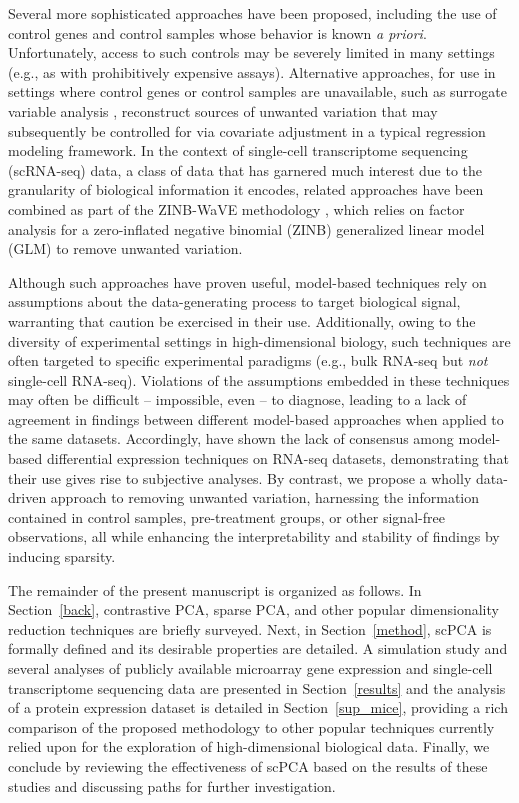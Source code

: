 Several more sophisticated approaches have been proposed, including the use of control genes \citep{gagnon2012using, risso2014normalization} and control samples \citep{gagnon2013removing} whose behavior is known \textit{a priori}. Unfortunately, access to such controls may be severely limited in many settings (e.g., as with prohibitively expensive assays). Alternative approaches, for use in settings where control genes or control samples are unavailable, such as surrogate variable analysis \citep{leek2007capturing}, reconstruct sources of unwanted variation that may subsequently be controlled for via covariate adjustment in a typical regression modeling framework. In the context of single-cell transcriptome sequencing (scRNA-seq) data, a class of data that has garnered much interest due to the granularity of biological information it encodes, related approaches have been combined as part of the ZINB-WaVE methodology \citep{risso2017zinb}, which relies on factor analysis for a zero-inflated negative binomial (ZINB) generalized linear model (GLM) to remove unwanted variation.

Although such approaches have proven useful, model-based techniques rely on assumptions about the data-generating process to target biological signal, warranting that caution be exercised in their use. Additionally, owing to the diversity of experimental settings in high-dimensional biology, such techniques are often targeted to specific experimental paradigms (e.g., bulk RNA-seq but \textit{not} single-cell RNA-seq). Violations of the assumptions embedded in these techniques may often be difficult -- impossible, even -- to diagnose, leading to a lack of agreement in findings between different model-based approaches when applied to the same datasets. Accordingly, \citet{zhang2014} have shown the lack of consensus among model-based differential expression techniques on RNA-seq datasets, demonstrating that their use gives rise to subjective analyses. By contrast, we propose a wholly data-driven approach to removing unwanted variation, harnessing the information contained in control samples, pre-treatment groups, or other signal-free observations, all while enhancing the interpretability and stability of findings by inducing sparsity.

The remainder of the present manuscript is organized as follows. In Section~\ref{back}, contrastive PCA, sparse PCA, and other popular dimensionality reduction techniques are briefly surveyed. Next, in Section~\ref{method}, scPCA is formally defined and its desirable properties are detailed. A simulation study and several analyses of publicly available microarray gene expression and single-cell transcriptome sequencing data are presented in Section~\ref{results} and the analysis of a protein expression dataset is detailed in Section~\ref{sup_mice}, providing a rich comparison of the proposed methodology to other popular techniques currently relied upon for the exploration of high-dimensional biological data. Finally, we conclude by reviewing the effectiveness of scPCA based on the results of these studies and discussing paths for further investigation. 

